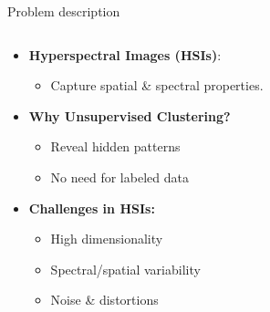\begin{frame}{Problem description}
\begin{columns}
        \begin{column}{0.62\textwidth}
            \begin{itemize}
                \item \textbf{Hyperspectral Images (HSIs)}: 
                \begin{itemize}
                    \item Capture spatial \& spectral properties.
                \end{itemize}
                \vspace{0.2cm}
                \item \textbf{Why Unsupervised Clustering?} 
                \begin{itemize}
                    \item Reveal hidden patterns
                    \item No need for labeled data
                \end{itemize}
                \vspace{0.2cm}
                \item \textbf{Challenges in HSIs:}
                \begin{itemize}
                    \item High dimensionality
                    \item Spectral/spatial variability
                    \item Noise \& distortions
                \end{itemize}
            \end{itemize}
        \end{column}
    \end{columns}
\end{frame}

